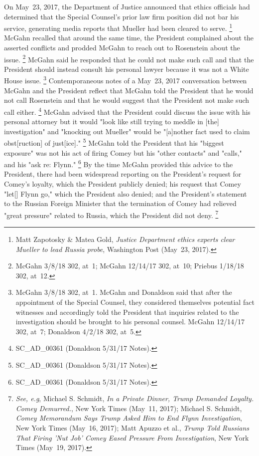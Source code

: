 On May~23, 2017, the Department of Justice announced that ethics officials had determined that the Special Counsel's prior law firm position did not bar his service, generating media reports that Mueller had been cleared to serve.%
\footnote{Matt Zapotosky \& Matea Gold, \textit{Justice Department ethics experts clear Mueller to lead Russia probe}, Washington Post (May~23, 2017).}
McGahn recalled that around the same time, the President complained about the asserted conflicts and prodded McGahn to reach out to Rosenstein about the issue.%
\footnote{McGahn 3/8/18 302, at~1;
McGahn 12/14/17 302, at~10;
Priebus 1/18/18 302, at~12.}
McGahn said he responded that he could not make such call and that the President should instead consult his personal lawyer because it was not a White House issue.%
\footnote{McGahn 3/8/18 302, at~1.
McGahn and Donaldson said that after the appointment of the Special Counsel, they considered themselves potential fact witnesses and accordingly told the President that inquiries related to the investigation should be brought to his personal counsel.
McGahn 12/14/17 302, at~7;
Donaldson 4/2/18 302, at~5.}
Contemporaneous notes of a May~23, 2017 conversation between McGahn and the President reflect that McGahn told the President that he would not call Rosenstein and that he would suggest that the President not make such call either.%
\footnote{SC\_AD\_00361 (Donaldson 5/31/17 Notes).}
McGahn advised that the President could discuss the issue with his personal attorney but it would "look like still trying to meddle in [the] investigation" and "knocking out Mueller" would be "[a]nother fact used to claim obst[ruction] of just[ice]."%
\footnote{SC\_AD\_00361 (Donaldson 5/31/17 Notes).}
McGahn told the President that his "biggest exposure" was not his act of firing Comey but his "other contacts" and "calls," and his "ask re: Flynn."%
\footnote{SC\_AD\_00361 (Donaldson 5/31/17 Notes).}
By the time McGahn provided this advice to the President, there had been widespread reporting on the President's request for Comey's loyalty, which the President publicly denied;
his request that Comey "let[] Flynn go," which the President also denied;
and the President's statement to the Russian Foreign Minister that the termination of Comey had relieved "great pressure" related to Russia, which the President did not deny.%
\footnote{\textit{See, e.g}, Michael S. Schmidt, \textit{In a Private Dinner, Trump Demanded Loyalty. Comey Demurred.}, New York Times (May~11, 2017);
Michael S. Schmidt, \textit{Comey Memorandum Says Trump Asked Him to End Flynn Investigation}, New York Times (May~16, 2017);
Matt Apuzzo et al., \textit{Trump Told Russians That Firing 'Nut Job' Comey Eased Pressure From Investigation}, New York Times (May~19, 2017).}

